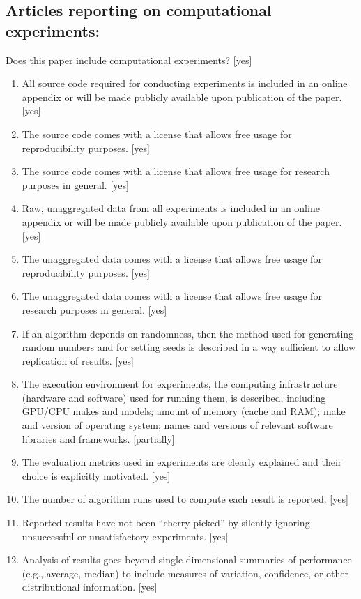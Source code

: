 \documentclass[manuscript,screen,review]{jair}
\begin{document}
\subsection*{Articles reporting on computational experiments:}
Does this paper include computational experiments? [yes]
\begin{enumerate}\setlength{\itemsep}{0pt}\setlength{\parsep}{0pt}\setlength{\topsep}{2pt}
    \item All source code required for conducting experiments is included in an online appendix or will be made publicly available upon publication of the paper. [yes]
    \item The source code comes with a license that allows free usage for reproducibility purposes. [yes]
    \item The source code comes with a license that allows free usage for research purposes in general. [yes]
    \item Raw, unaggregated data from all experiments is included in an online appendix or will be made publicly available upon publication of the paper. [yes]
    \item The unaggregated data comes with a license that allows free usage for reproducibility purposes. [yes]
    \item The unaggregated data comes with a license that allows free usage for research purposes in general. [yes]
    \item If an algorithm depends on randomness, then the method used for generating random numbers and for setting seeds is described in a way sufficient to allow replication of results. [yes]
    \item The execution environment for experiments, the computing infrastructure (hardware and software) used for running them, is described, including GPU/CPU makes and models; amount of memory (cache and RAM); make and version of operating system; names and versions of relevant software libraries and frameworks. [partially]
    \item The evaluation metrics used in experiments are clearly explained and their choice is explicitly motivated. [yes]
    \item The number of algorithm runs used to compute each result is reported. [yes]
    \item Reported results have not been ``cherry-picked'' by silently ignoring unsuccessful or unsatisfactory experiments. [yes]
    \item Analysis of results goes beyond single-dimensional summaries of performance (e.g., average, median) to include measures of variation, confidence, or other distributional information. [yes]

\end{enumerate}
\end{document}
